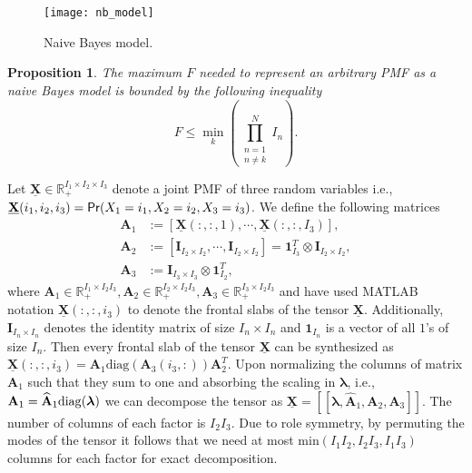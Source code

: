 \documentclass[journal]{IEEEtran}
\newtheorem{Prop}{Proposition}
\begin{document}
\begin{figure}[!t]
\centering
\texttt{[image: nb\_model]}
\caption{Naive Bayes model.}
\label{fig:naive_model}
\end{figure}

\begin{Prop}\label{prop:F_upperbound}
The maximum $F$ needed to represent an {\em arbitrary} PMF as a naive Bayes model is bounded by the following inequality
\begin{equation}\label{eq:F_up}
F\leq \underset{k}{\min}\left(\prod_{\substack{n=1 \\ n \neq k}}^N I_n\right).
\end{equation}
\end{Prop} 

{
\begin{IEEEproof}
Let $\underline{\mathbf{X}} \in \mathbb{R}_+^{I_1 \times I_2 \times I_3}$ denote a joint PMF of three random variables i.e., $\underline{\mathbf{X}}(i_1,i_2,i_3) = {\sf Pr}(X_1 = i_1, X_2 = i_2, X_3 = i_3)$. We define the following matrices
\begin{equation*}
\begin{aligned}
\mathbf{A}_1 &:= [\underline{\mathbf{X}}(:,:,1), \cdots, \underline{\mathbf{X}}(:,:,I_3)],  \\
\mathbf{A}_2 &:= [\mathbf{I}_{I_2 \times I_2}, \cdots, \mathbf{I}_{I_2 \times I_2}] = \textbf{1}_{I_3}^T \otimes \textbf{I}_{I_2 \times I_2},  \\
\mathbf{A}_3 &:= \textbf{I}_{I_3 \times I_3} \otimes \textbf{1}_{I_2}^T,
\end{aligned}
\end{equation*}
where $\mathbf{A}_1 \in \mathbb{R}_+^{I_1 \times I_2I_3}, \mathbf{A}_2 \in \mathbb{R}_+^{I_2 \times I_2I_3}, \mathbf{A}_3 \in \mathbb{R}_+^{I_3 \times I_2I_3}$ {and have used MATLAB notation $\underline{\mathbf{X}}(:,:,i_3)$ to denote the frontal slabs of the tensor $\underline{\mathbf{X}}$}. Additionally, $\mathbf{I}_{I_n \times I_n}$ denotes the identity matrix of size $I_n \times I_n$ and $\textbf{1}_{I_n}$ is a vector of all $1$'s of size $I_n$. Then every frontal slab of the tensor $\underline{\mathbf{X}}$ can be synthesized as $\underline{\mathbf{X}}(:,:,i_3) = \mathbf{A}_1 \textrm{diag}(\mathbf{A}_3(i_3,:)) \mathbf{A}_2^T.$
Upon normalizing the columns of matrix $\mathbf{A}_1$ such that they sum to one and absorbing the scaling in $\boldsymbol{\lambda}$, i.e., $\mathbf{A}_1=\mathbf{\widehat{A}}_1  \rm{diag}(\boldsymbol{\lambda}) $ we can decompose the tensor as $\underline{\mathbf{X}} = [\![\boldsymbol{\lambda},\mathbf{\widehat{A}}_1,\mathbf{A}_2,\mathbf{A}_3]\!]$. The number of columns of each factor is $I_2 I_3$. Due to role symmetry, by permuting the modes of the tensor it follows that we need at most $\textrm{min}(I_1I_2,I_2I_3,I_1I_3)$ columns for each factor for exact decomposition. 


\end{IEEEproof}}
\end{document}

